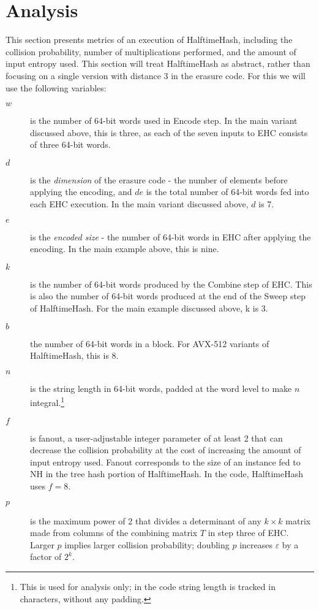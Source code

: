 \documentclass[sigconf, nonacm]{acmart}
\begin{document}


\section{Analysis}
\label{analysis}

This section presents metrics of an execution of HalftimeHash, including the collision probability, number of multiplications performed, and the amount of input entropy used.
This section will treat HalftimeHash as abstract, rather than focusing on a single version with distance 3 in the erasure code.
For this we will use the following variables:

\begin {description}
\item[$w$] is the number of 64-bit words used in Encode step.
  In the main variant discussed above, this is three, as each of the seven inputs to EHC consists of three 64-bit words.
\item[$d$] is the {\em dimension} of the erasure code - the number of elements before applying the encoding, and $d e$ is the total number of 64-bit words fed into each EHC execution.
  In the main variant discussed above, $d$ is 7.
\item[$e$] is the {\em encoded size} - the number of 64-bit words in EHC after applying the encoding.
  In the main example above, this is nine.
\item[$k$] is the number of 64-bit words produced by the Combine step of EHC.
  This is also the number of 64-bit words produced at the end of the Sweep step of HalftimeHash.
  For the main example discussed above, k is 3.
\item[$b$] the number of 64-bit words in a block.
  For AVX-512 variants of HalftimeHash, this is 8.
\item[$n$] is the string length in 64-bit words, padded at the word level to make $n$ integral.\footnote{This is used for analysis only; in the code string length is tracked in characters, without any padding.}
\item[$f$] is fanout, a user-adjustable integer parameter of at least 2 that can decrease the collision probability at the cost of increasing the amount of input entropy used.
  Fanout corresponds to the size of an instance fed to NH in the tree hash portion of HalftimeHash.
  In the code, HalftimeHash uses $f = 8$.
\item[$p$] is the maximum power of 2 that divides a determinant of any $k \times k$ matrix made from columns of the combining matrix $T$ in step three of EHC.
  Larger $p$ implies larger collision probability; doubling $p$ increases $\varepsilon$ by a factor of $2^k$.
\end{description}
\end{document}
